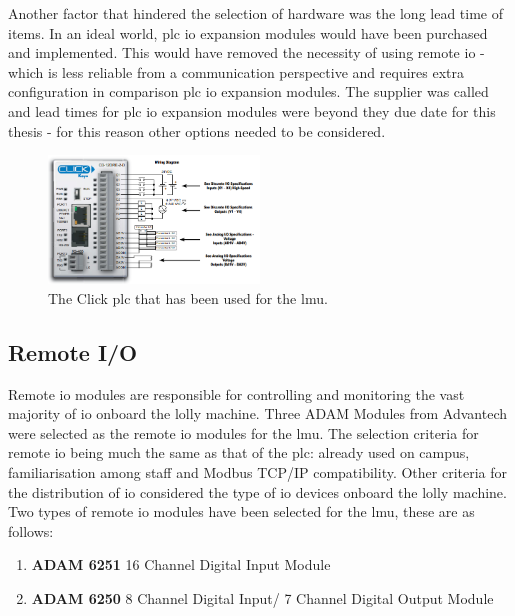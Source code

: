         Another factor that hindered the selection of hardware was the long lead time of items. In an ideal world, \acrshort{plc} \acrshort{io} expansion modules would have been purchased and implemented. This would have removed the necessity of using remote \acrshort{io} - which is less reliable from a communication perspective and requires extra configuration in comparison \acrshort{plc} \acrshort{io} expansion modules. The supplier was called and lead times for \acrshort{plc} \acrshort{io} expansion modules were beyond they due date for this thesis - for this reason other options needed to be considered.
    
        \begin{figure}[H]
            \centering
            \includegraphics[width = 0.5\textwidth]{2_images/clickPlc}
            \caption{The Click \acrshort{plc} that has been used for the \acrshort{lmu}\cite{clickPlcData}.}
            \label{fig:plc}
        \end{figure} 
    
    \subsection{Remote I/O}
        Remote \acrshort{io} modules are responsible for controlling and monitoring the vast majority of \acrshort{io} onboard the lolly machine.
        Three ADAM Modules from Advantech were selected as the remote \acrshort{io} modules for the \acrshort{lmu}. The selection criteria for remote \acrshort{io} being much the same as that of the \acrshort{plc}: already used on campus, familiarisation among staff and Modbus TCP/IP compatibility. Other criteria for the distribution of \acrshort{io} considered the type of \acrshort{io} devices onboard the lolly machine. Two types of remote \acrshort{io} modules have been selected for the \acrshort{lmu}, these are as follows:
        \begin{enumerate}
            \item \textbf{ADAM 6251} 16 Channel Digital Input Module
            \item \textbf{ADAM 6250} 8 Channel Digital Input/ 7 Channel Digital Output Module
        \end{enumerate}
    
